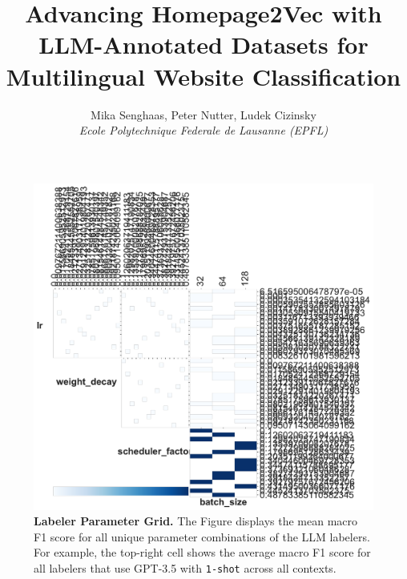 \documentclass{article}
\begin{document}
\thispagestyle{empty} 

\title{
  Advancing Homepage2Vec with LLM-Annotated Datasets for Multilingual Website Classification
}

\author{
  Mika Senghaas, Peter Nutter, Ludek Cizinsky \\[0.5em]
  \textit{Ecole Polytechnique Federale de Lausanne (EPFL)}\\
}
\maketitle





\begin{figure}[!h]
    \centering
    \includegraphics[width=.8\columnwidth]{figures/labeler-grid.pdf}
    \caption{\textbf{Labeler Parameter Grid.} The Figure displays the mean macro F1 score for all unique parameter combinations of the LLM labelers. For example, the top-right cell shows the average macro F1 score for all labelers that use GPT-3.5 with \texttt{1-shot} across all contexts.}
    \label{fig:labelers-grid}
\end{figure}






\newpage



\appendix


\end{document}
